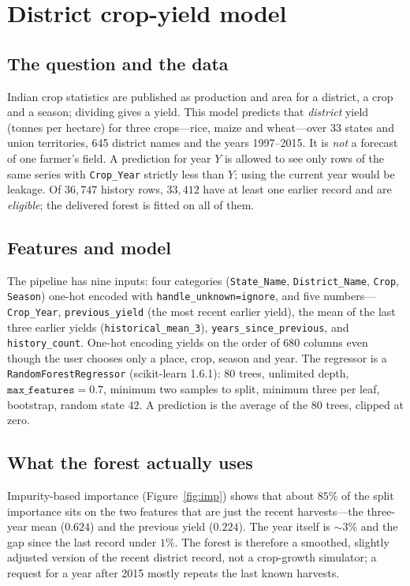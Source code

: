 \documentclass[11pt,a4paper]{article}
\begin{document}
\section{District crop-yield model}\label{sec:yield}

\subsection{The question and the data}
Indian crop statistics are published as production and area for a district, a crop and a season;
dividing gives a yield. This model predicts that \emph{district} yield (tonnes per hectare) for
three crops---rice, maize and wheat---over 33 states and union territories, 645 district names and
the years 1997--2015. It is \emph{not} a forecast of one farmer's field. A prediction for year $Y$
is allowed to see only rows of the same series with \texttt{Crop\_Year} strictly less than $Y$;
using the current year would be leakage. Of $36{,}747$ history rows, $33{,}412$ have at least one
earlier record and are \emph{eligible}; the delivered forest is fitted on all of them.

\subsection{Features and model}
The pipeline has nine inputs: four categories (\texttt{State\_Name}, \texttt{District\_Name},
\texttt{Crop}, \texttt{Season}) one-hot encoded with \texttt{handle\_unknown=ignore}, and five
numbers---\texttt{Crop\_Year}, \texttt{previous\_yield} (the most recent earlier yield), the mean of
the last three earlier yields (\texttt{historical\_mean\_3}), \texttt{years\_since\_previous}, and
\texttt{history\_count}. One-hot encoding yields on the order of $680$ columns even though the user
chooses only a place, crop, season and year. The regressor is a
\texttt{RandomForestRegressor} (scikit-learn 1.6.1): $80$ trees, unlimited depth,
$\texttt{max\_features}=0.7$, minimum two samples to split, minimum three per leaf, bootstrap,
random state $42$. A prediction is the average of the 80 trees, clipped at zero.

\subsection{What the forest actually uses}
Impurity-based importance (Figure~\ref{fig:imp}) shows that about $85\%$ of the split importance
sits on the two features that are just the recent harvests---the three-year mean ($0.624$) and the
previous yield ($0.224$). The year itself is $\sim3\%$ and the gap since the last record under
$1\%$. The forest is therefore a smoothed, slightly adjusted version of the recent district record,
not a crop-growth simulator; a request for a year after 2015 mostly repeats the last known harvests.
\end{document}
